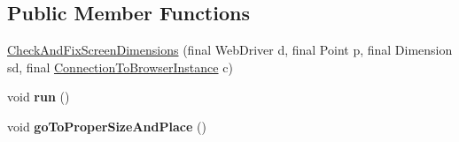 \subsection*{Public Member Functions}
\begin{DoxyCompactItemize}
\item 
\hyperlink{classgov_1_1fnal_1_1ppd_1_1dd_1_1display_1_1client_1_1selenium_1_1CheckAndFixScreenDimensions_ab880551add7643dc6df11cae3aaa83b4}{Check\-And\-Fix\-Screen\-Dimensions} (final Web\-Driver d, final Point p, final Dimension sd, final \hyperlink{classgov_1_1fnal_1_1ppd_1_1dd_1_1display_1_1client_1_1ConnectionToBrowserInstance}{Connection\-To\-Browser\-Instance} c)
\item 
\hypertarget{classgov_1_1fnal_1_1ppd_1_1dd_1_1display_1_1client_1_1selenium_1_1CheckAndFixScreenDimensions_a78a97c7a284cd33ea543d39aaa663ebc}{void {\bfseries run} ()}\label{classgov_1_1fnal_1_1ppd_1_1dd_1_1display_1_1client_1_1selenium_1_1CheckAndFixScreenDimensions_a78a97c7a284cd33ea543d39aaa663ebc}

\item 
\hypertarget{classgov_1_1fnal_1_1ppd_1_1dd_1_1display_1_1client_1_1selenium_1_1CheckAndFixScreenDimensions_ae141a36b6c496443e18172b63c40af35}{void {\bfseries go\-To\-Proper\-Size\-And\-Place} ()}\label{classgov_1_1fnal_1_1ppd_1_1dd_1_1display_1_1client_1_1selenium_1_1CheckAndFixScreenDimensions_ae141a36b6c496443e18172b63c40af35}

\end{DoxyCompactItemize}


